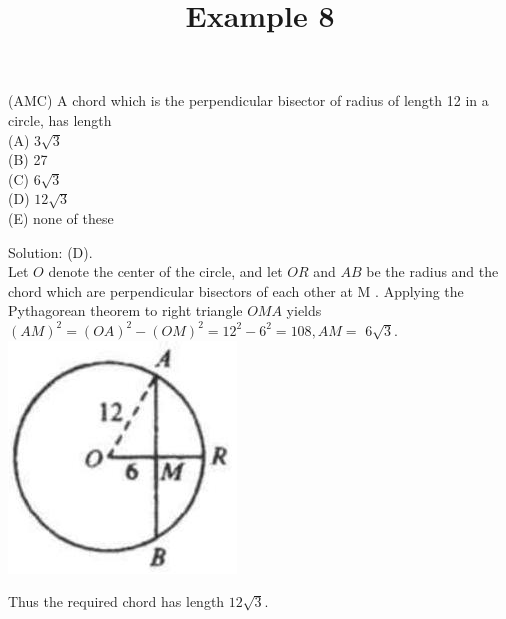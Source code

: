 \documentclass{article}
\title{Example 8}
\date{}
\begin{document}
\maketitle

(AMC) A chord which is the perpendicular bisector of radius of length 12 in a circle, has length\\
(A) \(3 \sqrt{3}\)\\
(B) 27\\
(C) \(6 \sqrt{3}\)\\
(D) \(12 \sqrt{3}\)\\
(E) none of these

Solution: (D).\\
Let \(O\) denote the center of the circle, and let \(O R\) and \(A B\) be the radius and the chord which are perpendicular bisectors of each other at M . Applying the Pythagorean theorem to right triangle \(O M A\) yields \((A M)^{2}=(O A)^{2}-(O M)^{2}=12^{2}-6^{2}=108, A M=\) \(6 \sqrt{3}\).\\
\centering
\includegraphics[width=\textwidth]{images/150(1).jpg}

Thus the required chord has length \(12 \sqrt{3}\).\\
\end{document}
